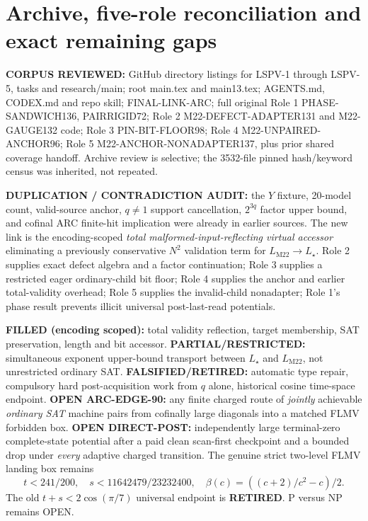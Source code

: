 \documentclass[11pt]{article}
\begin{document}
\section{Archive, five-role reconciliation and exact remaining gaps}
\textbf{CORPUS REVIEWED:} GitHub directory listings for LSPV-1 through LSPV-5, tasks and research/main; root main.tex and main13.tex; AGENTS.md, CODEX.md and repo skill; FINAL-LINK-ARC; full original Role 1 PHASE-SANDWICH136, PAIRRIGID72; Role 2 M22-DEFECT-ADAPTER131 and M22-GAUGE132 code; Role 3 PIN-BIT-FLOOR98; Role 4 M22-UNPAIRED-ANCHOR96; Role 5 M22-ANCHOR-NONADAPTER137, plus prior shared coverage handoff. Archive review is selective; the 3532-file pinned hash/keyword census was inherited, not repeated.

\textbf{DUPLICATION / CONTRADICTION AUDIT:} the $Y$ fixture, 20-model count, valid-source anchor, $q\ne1$ support cancellation, $2^{3q}$ factor upper bound, and cofinal ARC finite-hit implication were already in earlier sources. The new link is the encoding-scoped \emph{total malformed-input-reflecting virtual accessor} eliminating a previously conservative $N^2$ validation term for $L_{\mathrm{M22}}\to L_\star$. Role 2 supplies exact defect algebra and a factor continuation; Role 3 supplies a restricted eager ordinary-child bit floor; Role 4 supplies the anchor and earlier total-validity overhead; Role 5 supplies the invalid-child nonadapter; Role 1's phase result prevents illicit universal post-last-read potentials.

\textbf{FILLED (encoding scoped):} total validity reflection, target membership, SAT preservation, length and bit accessor. \textbf{PARTIAL/RESTRICTED:} simultaneous exponent upper-bound transport between $L_\star$ and $L_{\mathrm{M22}}$, not unrestricted ordinary SAT. \textbf{FALSIFIED/RETIRED:} automatic type repair, compulsory hard post-acquisition work from $q$ alone, historical cosine time-space endpoint. \textbf{OPEN ARC-EDGE-90:} any finite charged route of \emph{jointly} achievable \emph{ordinary SAT} machine pairs from cofinally large diagonals into a matched FLMV forbidden box. \textbf{OPEN DIRECT-POST:} independently large terminal-zero complete-state potential after a paid clean scan-first checkpoint and a bounded drop under \emph{every} adaptive charged transition. The genuine strict two-level FLMV landing box remains
\[
t<241/200,\quad s<11642479/23232400,\quad
\beta(c)=((c+2)/c^2-c)/2.
\]
The old $t+s<2\cos(\pi/7)$ universal endpoint is \textbf{RETIRED}. P versus NP remains OPEN.
\end{document}
